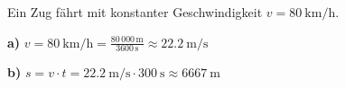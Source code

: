 \begin{questions}

  \begin{taskbox}[Aufgabe 1]
  \question[4] Ein Zug fährt mit konstanter Geschwindigkeit
  $v = \SI{80}{\kilo\meter\per\hour}$.


  \begin{solution}
    \textbf{a)} $v = \SI{80}{\kilo\meter\per\hour} = \frac{80\,000\,\si{\meter}}{3600\,\si{\second}} \approx \SI{22.2}{\meter\per\second}$

    \textbf{b)} $s = v \cdot t = \SI{22.2}{\meter\per\second} \cdot \SI{300}{\second} \approx \SI{6667}{\meter}$
  \end{solution}
  \end{taskbox}

\end{questions}


